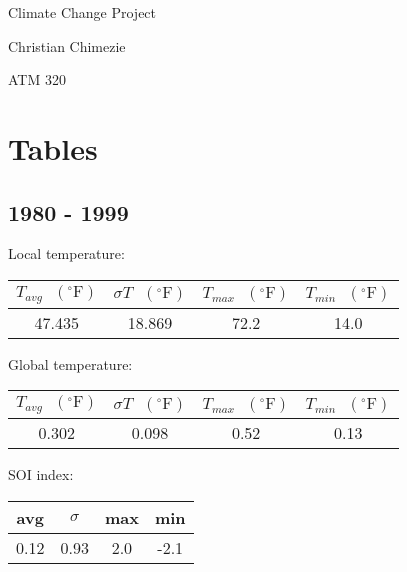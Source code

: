 \documentclass[12pt]{article}
\begin{document}
{\LARGE Climate Change Project}

{\large Christian Chimezie}

{\large ATM 320}

\noindent\makebox[\linewidth]{\rule{16.51cm}{0.4pt}}

\section*{Tables}

\subsection*{1980 - 1999}
Local temperature:
\begin{center}
\begin{tabular}{c | c | c | c}
	$T_{avg} \textrm{ } (^{\circ} \textrm{F})$ &
	$\sigma T \textrm{ } (^{\circ} \textrm{F})$ &
	$T_{max} \textrm{ } (^{\circ} \textrm{F})$ &
	$T_{min} \textrm{ } (^{\circ} \textrm{F})$ \\ %
	\hline
	47.435 & 18.869 & 72.2 & 14.0 \\ %
\end{tabular}
\end{center}
Global temperature:
\begin{center}
\begin{tabular}{c | c | c | c}
	$T_{avg} \textrm{ } (^{\circ} \textrm{F})$ &
	$\sigma T \textrm{ } (^{\circ} \textrm{F})$ &
	$T_{max} \textrm{ } (^{\circ} \textrm{F})$ &
	$T_{min} \textrm{ } (^{\circ} \textrm{F})$ \\ %
	\hline
	0.302 & 0.098 & 0.52 & 0.13 \\ %
\end{tabular}
\end{center}
SOI index:
\begin{center}
\begin{tabular}{c | c | c | c}
	avg & $\sigma$ & max & min \\ %
	\hline
	0.12 & 0.93 & 2.0 & -2.1 \\ %
\end{tabular}
\end{center}
\end{document}
